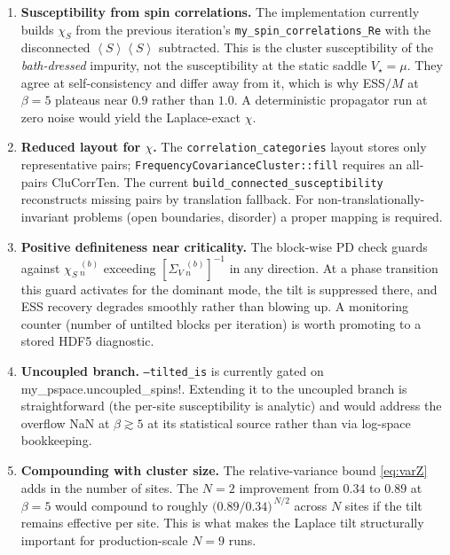 \documentclass[11pt]{article}
\newcommand{\ev}[1]{\left\langle #1 \right\rangle}
\newcommand{\Sig}{\Sigma_V}
\begin{document}
\begin{enumerate}
  \item \textbf{Susceptibility from spin correlations.} The
        implementation currently builds $\chi_S$ from the previous
        iteration's \verb!my_spin_correlations_Re! with the disconnected
        $\ev{S}\ev{S}$ subtracted. This is the cluster susceptibility
        of the \emph{bath-dressed} impurity, not the susceptibility at
        the static saddle $V_\star = \mu$. They agree at
        self-consistency and differ away from it, which is why
        ESS$/M$ at $\beta=5$ plateaus near $0.9$ rather than $1.0$. A
        deterministic propagator run at zero noise would yield the
        Laplace-exact $\chi$.
  \item \textbf{Reduced layout for $\chi$.} The
        \verb!correlation_categories! layout stores only representative
        pairs; \verb!FrequencyCovarianceCluster::fill! requires an
        all-pairs CluCorrTen. The current
        \verb!build_connected_susceptibility! reconstructs missing
        pairs by translation fallback. For non-translationally-invariant
        problems (open boundaries, disorder) a proper mapping is
        required.
  \item \textbf{Positive definiteness near criticality.} The block-wise
        PD check guards against $\chi_S\,_n^{(b)}$ exceeding
        $[\Sig\,_n^{(b)}]^{-1}$ in any direction. At a phase transition
        this guard activates for the dominant mode, the tilt is
        suppressed there, and ESS recovery degrades smoothly rather
        than blowing up. A monitoring counter (number of untilted
        blocks per iteration) is worth promoting to a stored HDF5
        diagnostic.
  \item \textbf{Uncoupled branch.} \texttt{--tilted\_is} is currently
        gated on \verb!!my_pspace.uncoupled_spins!. Extending it to the
        uncoupled branch is straightforward (the per-site susceptibility
        is analytic) and would address the overflow NaN at
        $\beta\!\gtrsim\!5$ at its statistical source rather than via
        log-space bookkeeping.
  \item \textbf{Compounding with cluster size.} The relative-variance
        bound \eqref{eq:varZ} adds in the number of sites. The
        $N=2$ improvement from $0.34$ to $0.89$ at $\beta=5$ would
        compound to roughly $\bigl(0.89/0.34\bigr)^{\,N/2}$ across
        $N$ sites if the tilt remains effective per site. This is
        what makes the Laplace tilt structurally important for
        production-scale $N=9$ runs.
\end{enumerate}
\end{document}
